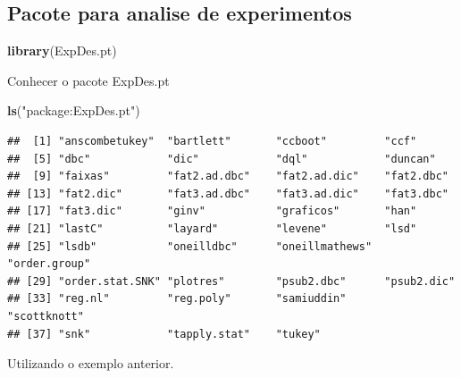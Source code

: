 \documentclass[
]{book}
\newenvironment{Shaded}{\begin{snugshade}}{\end{snugshade}}
\newcommand{\DataTypeTok}[1]{\textcolor[rgb]{0.13,0.29,0.53}{#1}}
\newcommand{\KeywordTok}[1]{\textcolor[rgb]{0.13,0.29,0.53}{\textbf{#1}}}
\newcommand{\NormalTok}[1]{#1}
\newcommand{\OperatorTok}[1]{\textcolor[rgb]{0.81,0.36,0.00}{\textbf{#1}}}
\newcommand{\StringTok}[1]{\textcolor[rgb]{0.31,0.60,0.02}{#1}}
\begin{document}
\hypertarget{pacote-para-analise-de-experimentos}{%
\subsection{Pacote para analise de experimentos}\label{pacote-para-analise-de-experimentos}}

\begin{Shaded}
\begin{Highlighting}[]
\KeywordTok{library}\NormalTok{(ExpDes.pt)}
\end{Highlighting}
\end{Shaded}

Conhecer o pacote ExpDes.pt

\begin{Shaded}
\begin{Highlighting}[]
\KeywordTok{ls}\NormalTok{(}\StringTok{"package:ExpDes.pt"}\NormalTok{)}
\end{Highlighting}
\end{Shaded}

\begin{verbatim}
##  [1] "anscombetukey"  "bartlett"       "ccboot"         "ccf"           
##  [5] "dbc"            "dic"            "dql"            "duncan"        
##  [9] "faixas"         "fat2.ad.dbc"    "fat2.ad.dic"    "fat2.dbc"      
## [13] "fat2.dic"       "fat3.ad.dbc"    "fat3.ad.dic"    "fat3.dbc"      
## [17] "fat3.dic"       "ginv"           "graficos"       "han"           
## [21] "lastC"          "layard"         "levene"         "lsd"           
## [25] "lsdb"           "oneilldbc"      "oneillmathews"  "order.group"   
## [29] "order.stat.SNK" "plotres"        "psub2.dbc"      "psub2.dic"     
## [33] "reg.nl"         "reg.poly"       "samiuddin"      "scottknott"    
## [37] "snk"            "tapply.stat"    "tukey"
\end{verbatim}

Utilizando o exemplo anterior.

\begin{Shaded}
\end{Shaded}
\end{document}
